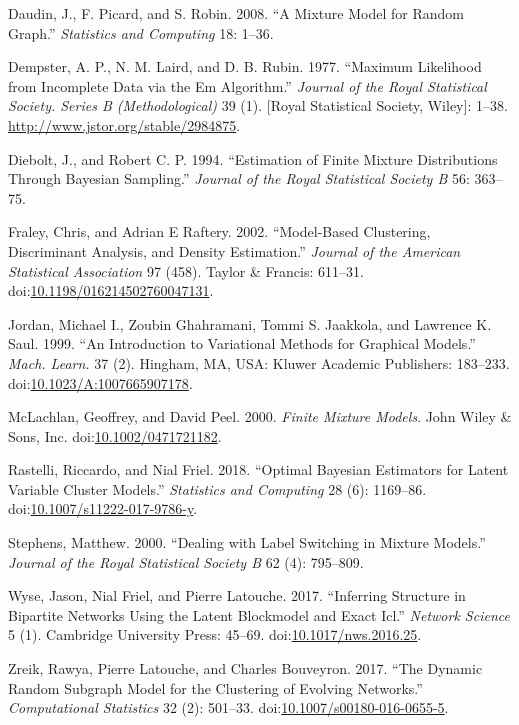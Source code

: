 \documentclass[]{article}
\begin{document}
\hypertarget{ref-Daudin2008}{}
Daudin, J., F. Picard, and S. Robin. 2008. ``A Mixture Model for Random
Graph.'' \emph{Statistics and Computing} 18: 1--36.

\hypertarget{ref-Dempster77}{}
Dempster, A. P., N. M. Laird, and D. B. Rubin. 1977. ``Maximum
Likelihood from Incomplete Data via the Em Algorithm.'' \emph{Journal of
the Royal Statistical Society. Series B (Methodological)} 39 (1).
{[}Royal Statistical Society, Wiley{]}: 1--38.
\url{http://www.jstor.org/stable/2984875}.

\hypertarget{ref-Diebolt1994}{}
Diebolt, J., and Robert C. P. 1994. ``Estimation of Finite Mixture
Distributions Through Bayesian Sampling.'' \emph{Journal of the Royal
Statistical Society B} 56: 363--75.

\hypertarget{ref-Fraley2002}{}
Fraley, Chris, and Adrian E Raftery. 2002. ``Model-Based Clustering,
Discriminant Analysis, and Density Estimation.'' \emph{Journal of the
American Statistical Association} 97 (458). Taylor \& Francis: 611--31.
doi:\href{https://doi.org/10.1198/016214502760047131}{10.1198/016214502760047131}.

\hypertarget{ref-Jordan1999}{}
Jordan, Michael I., Zoubin Ghahramani, Tommi S. Jaakkola, and Lawrence
K. Saul. 1999. ``An Introduction to Variational Methods for Graphical
Models.'' \emph{Mach. Learn.} 37 (2). Hingham, MA, USA: Kluwer Academic
Publishers: 183--233.
doi:\href{https://doi.org/10.1023/A:1007665907178}{10.1023/A:1007665907178}.

\hypertarget{ref-McLachlan2000}{}
McLachlan, Geoffrey, and David Peel. 2000. \emph{Finite Mixture Models}.
John Wiley \& Sons, Inc.
doi:\href{https://doi.org/10.1002/0471721182}{10.1002/0471721182}.

\hypertarget{ref-Rastelli2018}{}
Rastelli, Riccardo, and Nial Friel. 2018. ``Optimal Bayesian Estimators
for Latent Variable Cluster Models.'' \emph{Statistics and Computing} 28
(6): 1169--86.
doi:\href{https://doi.org/10.1007/s11222-017-9786-y}{10.1007/s11222-017-9786-y}.

\hypertarget{ref-Stephens2000}{}
Stephens, Matthew. 2000. ``Dealing with Label Switching in Mixture
Models.'' \emph{Journal of the Royal Statistical Society B} 62 (4):
795--809.

\hypertarget{ref-Wyse2017}{}
Wyse, Jason, Nial Friel, and Pierre Latouche. 2017. ``Inferring
Structure in Bipartite Networks Using the Latent Blockmodel and Exact
Icl.'' \emph{Network Science} 5 (1). Cambridge University Press: 45--69.
doi:\href{https://doi.org/10.1017/nws.2016.25}{10.1017/nws.2016.25}.

\hypertarget{ref-Zreik2017}{}
Zreik, Rawya, Pierre Latouche, and Charles Bouveyron. 2017. ``The
Dynamic Random Subgraph Model for the Clustering of Evolving Networks.''
\emph{Computational Statistics} 32 (2): 501--33.
doi:\href{https://doi.org/10.1007/s00180-016-0655-5}{10.1007/s00180-016-0655-5}.
\end{document}
